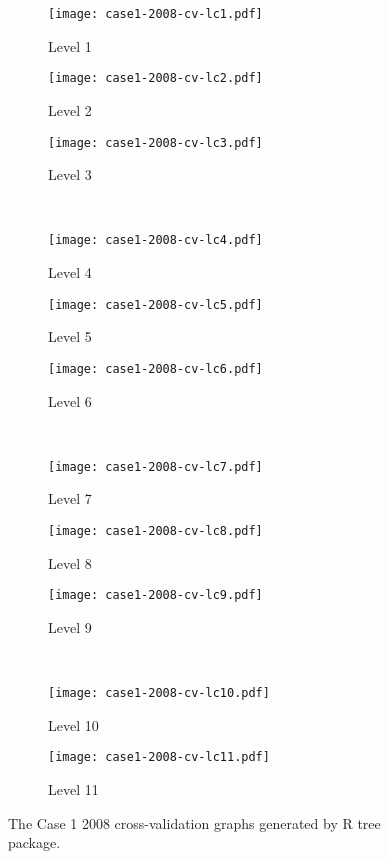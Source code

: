\begin{appendices}
\begin{figure}[!ht] \centering
	\captionsetup[subfigure]{width=2.0in}
	\begin{subfigure}[t]{0.32\textwidth}
		\texttt{[image: case1-2008-cv-lc1.pdf]}
		\caption{Level 1}
	\end{subfigure}
	\begin{subfigure}[t]{0.32\textwidth}
		\texttt{[image: case1-2008-cv-lc2.pdf]}
		\caption{Level 2}
	\end{subfigure}
	\begin{subfigure}[t]{0.32\textwidth}
		\texttt{[image: case1-2008-cv-lc3.pdf]}
		\caption{Level 3}
	\end{subfigure}\\
	\vspace{5pt}
	\begin{subfigure}[t]{0.32\textwidth}
		\texttt{[image: case1-2008-cv-lc4.pdf]}
		\caption{Level 4}
	\end{subfigure}
	\begin{subfigure}[t]{0.32\textwidth}
		\texttt{[image: case1-2008-cv-lc5.pdf]}
		\caption{Level 5}
	\end{subfigure}
	\begin{subfigure}[t]{0.32\textwidth}
		\texttt{[image: case1-2008-cv-lc6.pdf]}
		\caption{Level 6}
	\end{subfigure}\\
	\vspace{5pt}	
	\begin{subfigure}[t]{0.32\textwidth}
		\texttt{[image: case1-2008-cv-lc7.pdf]}
		\caption{Level 7}
	\end{subfigure}
	\begin{subfigure}[t]{0.32\textwidth}
		\texttt{[image: case1-2008-cv-lc8.pdf]}
		\caption{Level 8}
	\end{subfigure}
	\begin{subfigure}[t]{0.32\textwidth}
		\texttt{[image: case1-2008-cv-lc9.pdf]}
		\caption{Level 9}
	\end{subfigure}\\
	\vspace{5pt}
	\begin{subfigure}[t]{0.32\textwidth}
		\texttt{[image: case1-2008-cv-lc10.pdf]}
		\caption{Level 10}
	\end{subfigure}
	\begin{subfigure}[t]{0.32\textwidth}
		\texttt{[image: case1-2008-cv-lc11.pdf]}
		\caption{Level 11}
	\end{subfigure}
	\vspace{5pt}
	\caption[The Case 1 2008 cross-validation graphs generated by R tree package.]{The Case 1 2008 cross-validation graphs generated by R tree package.}
	\label{fig: appendix-fig.c4.cv}
\end{figure}


\end{appendices}
